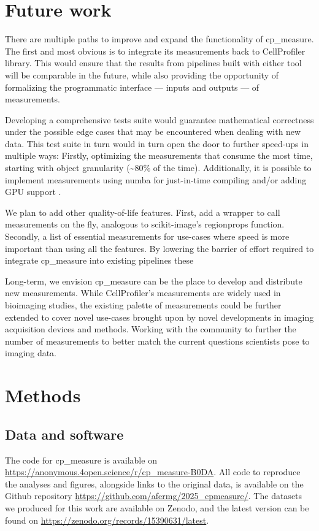 \documentclass{article}
\begin{document}
\section{Future work}
\label{sec:org5cdbb12}
There are multiple paths to improve and expand the functionality of cp\_measure. The first and most obvious is to integrate its measurements back to CellProfiler library. This would ensure that the results from pipelines built with either tool will be comparable in the future, while also providing the opportunity of formalizing the programmatic interface --- inputs and outputs --- of measurements.

Developing a comprehensive tests suite would guarantee mathematical correctness under the possible edge cases that may be encountered when dealing with new data. This test suite in turn would in turn open the door to further speed-ups in multiple ways: Firstly, optimizing the measurements that consume the most time, starting with object granularity (\textasciitilde{}80\% of the time). Additionally, it is possible to implement measurements using numba for just-in-time compiling and/or adding GPU support \citep{lamNumbaLLVMbasedPython2015}.

We plan to add other quality-of-life features. First, add a wrapper to call measurements on the fly, analogous to scikit-image's regionprops function. Secondly, a list of essential measurements for use-cases where speed is more important than using all the features. By lowering the barrier of effort required to integrate cp\_measure into existing pipelines these 

Long-term, we envision cp\_measure can be the place to develop and distribute new measurements. While CellProfiler's measurements are widely used in bioimaging studies, the existing palette of measurements could be further extended to cover novel use-cases brought upon by novel developments in imaging acquisition devices and methods. Working with the community to further the number of measurements to better match the current questions scientists pose to imaging data.
\section{Methods}
\label{sec:org91ddb3a}
\subsection{Data and software}
\label{sec:orgf44b7cd}
The code for cp\_measure is available on \url{https://anonymous.4open.science/r/cp\_measure-B0DA}. All code to reproduce the analyses and figures, alongside links to the original data, is available on the Github repository \url{https://github.com/afermg/2025\_cpmeasure/}. The datasets we produced for this work are available on Zenodo, and the latest version can be found on \url{https://zenodo.org/records/15390631/latest}.



\end{document}
